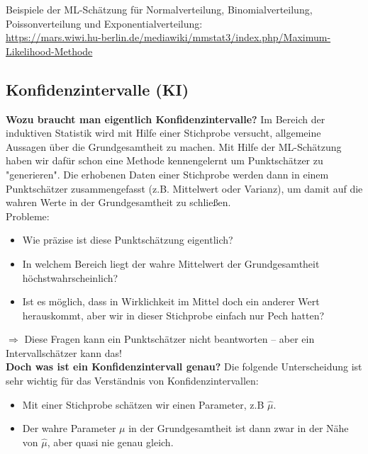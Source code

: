 \documentclass[a4paper]{article}
\newcommand\dangersign[1][2ex]{%
  \renewcommand\stacktype{L}%
  \scaleto{\stackon[1.3pt]{\color{red}$\triangle$}{\tiny !}}{#1}%
}
\begin{document}
\noindent Beispiele der ML-Schätzung für Normalverteilung, Binomialverteilung, Poissonverteilung und Exponentialverteilung:\\
\url{https://mars.wiwi.hu-berlin.de/mediawiki/mmstat3/index.php/Maximum-Likelihood-Methode}


\clearpage

\subsection{Konfidenzintervalle (KI)}\label{sec:KI}

\textbf{Wozu braucht man eigentlich Konfidenzintervalle?} Im Bereich der induktiven Statistik wird mit Hilfe einer Stichprobe versucht, allgemeine Aussagen über die Grundgesamtheit zu machen. Mit Hilfe der ML-Schätzung haben wir dafür schon eine Methode kennengelernt um Punktschätzer zu "generieren". Die erhobenen Daten einer Stichprobe werden dann in einem Punktschätzer zusammengefasst (z.B. Mittelwert oder Varianz), um damit auf die wahren Werte in der Grundgesamtheit zu schließen.\\

\noindent \dangersign[3ex] Probleme:

\begin{itemize}
    \item Wie präzise ist diese Punktschätzung eigentlich?
    \item In welchem Bereich liegt der wahre Mittelwert der Grundgesamtheit höchstwahrscheinlich?
    \item Ist es möglich, dass in Wirklichkeit im Mittel doch ein anderer Wert herauskommt, aber wir in dieser Stichprobe einfach nur Pech hatten?
\end{itemize}

\noindent $\Rightarrow$ Diese Fragen kann ein Punktschätzer nicht beantworten – aber ein Intervallschätzer kann das!\\

\noindent \textbf{Doch was ist ein Konfidenzintervall genau?} Die folgende Unterscheidung ist sehr wichtig für das Verständnis von Konfidenzintervallen:

\begin{itemize}
    \item Mit einer Stichprobe schätzen wir einen Parameter, z.B $\hat{\mu}$.
    \item Der wahre Parameter $\mu$ in der Grundgesamtheit ist dann zwar in der Nähe von $\hat{\mu}$, aber quasi nie genau gleich.
\end{itemize}
\end{document}
